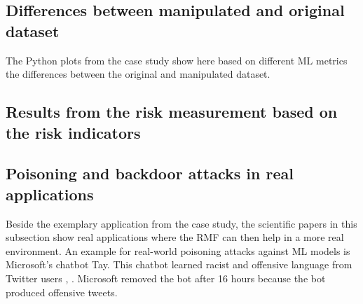 \subsection{Differences between manipulated and original dataset}

The Python plots from the case study show here based on different ML metrics the differences between the original and manipulated dataset.

\subsection{Results from the risk measurement based on the risk indicators}

\subsection{Poisoning and backdoor attacks in real applications}

Beside the exemplary application from the case study, the scientific papers in this subsection show real applications where the RMF can then help in a more real environment. An example for real-world poisoning attacks against ML models is Microsoft's chatbot Tay. This chatbot learned racist and offensive language from Twitter users \cite{DBLP:conf/iciot/BaracaldoCLSZ18}, \cite{DBLP:conf/ccs/BaracaldoCLS17}. Microsoft removed the bot after 16 hours because the bot produced offensive tweets.

\newpage

